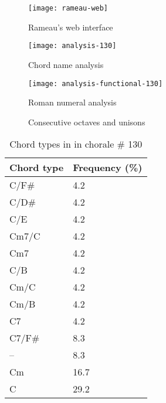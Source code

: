 \documentclass[a0paper]{sciposter}
\begin{document}
\begin{center}
\begin{multicols}{2}

\begin{figure}
  \centering
  \texttt{[image: rameau-web]}
  \caption{Rameau's web interface}
  \label{fig:rameau-web}
\end{figure}

\begin{figure}
  \centering
  \texttt{[image: analysis-130]}
  \caption{Chord name analysis}
  \label{fig:chord-name-analysis}
\end{figure}
\begin{figure}
  \centering
  \texttt{[image: analysis-functional-130]}  
  \caption{Roman numeral analysis}
  \label{fig:roman-analysis}
\end{figure}

\begin{figure}[!h]
  \centering
  \qquad
  \qquad
  \caption{Consecutive octaves and unisons}
  \label{fig:oitavas-e-unissonos}
\end{figure}

\begin{table}[t]
  \centering
\begin{tabular}{l|l} \hline
 Chord type & Frequency (\%) \\ \hline
 C/F\#                & 4.2 \\
 C/D\#                & 4.2\\
 C/E                 & 4.2\\
 Cm7/C               & 4.2\\
 Cm7                 & 4.2\\
 C/B                 & 4.2\\
 Cm/C                & 4.2\\
 Cm/B                & 4.2\\
 C7                  & 4.2\\
 C7/F\#               & 8.3\\
 --                  & 8.3\\
 Cm                  &16.7\\
 C                   &29.2 \\ \hline
\end{tabular}
\caption{Chord types in in chorale \# 130}
\label{tab:ctc130}
\end{table}


\end{multicols}
\end{center}
\end{document}

